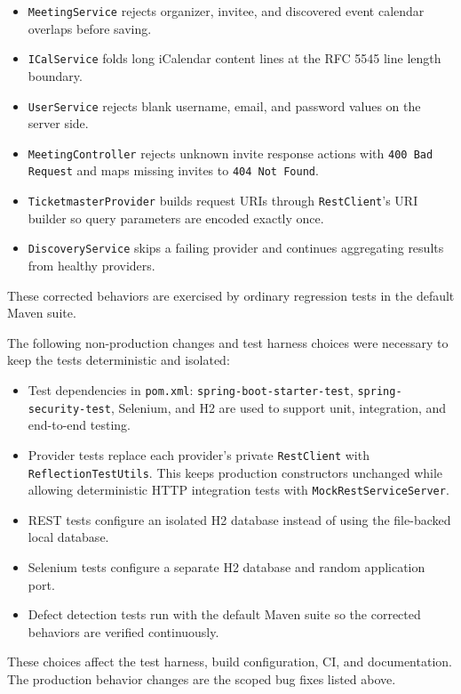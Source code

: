 \begin{itemize}
\item \texttt{MeetingService} rejects organizer, invitee, and discovered event calendar overlaps before saving.
\item \texttt{ICalService} folds long iCalendar content lines at the RFC 5545 line length boundary.
\item \texttt{UserService} rejects blank username, email, and password values on the server side.
\item \texttt{MeetingController} rejects unknown invite response actions with \texttt{400 Bad Request} and maps missing invites to \texttt{404 Not Found}.
\item \texttt{TicketmasterProvider} builds request URIs through \texttt{RestClient}'s URI builder so query parameters are encoded exactly once.
\item \texttt{DiscoveryService} skips a failing provider and continues aggregating results from healthy providers.
\end{itemize}

These corrected behaviors are exercised by ordinary regression tests in the default Maven suite.

The following non-production changes and test harness choices were necessary to keep the tests deterministic and isolated:

\begin{itemize}
\item Test dependencies in \texttt{pom.xml}: \texttt{spring-boot-starter-test}, \texttt{spring-security-test}, Selenium, and H2 are used to support unit, integration, and end-to-end testing.
\item Provider tests replace each provider's private \texttt{RestClient} with \texttt{ReflectionTestUtils}. This keeps production constructors unchanged while allowing deterministic HTTP integration tests with \texttt{MockRestServiceServer}.
\item REST tests configure an isolated H2 database instead of using the file-backed local database.
\item Selenium tests configure a separate H2 database and random application port.
\item Defect detection tests run with the default Maven suite so the corrected behaviors are verified continuously.
\end{itemize}

These choices affect the test harness, build configuration, CI, and documentation. The production behavior changes are the scoped bug fixes listed above.
